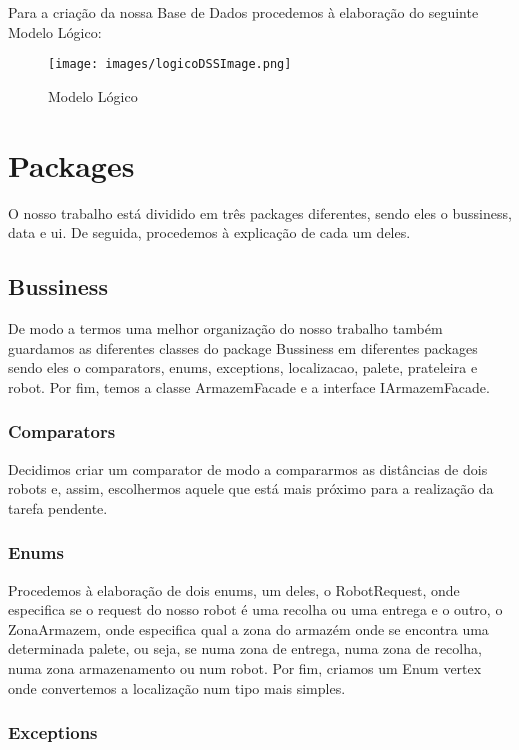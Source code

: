 \documentclass[11pt]{article}
\begin{document}
Para a criação da nossa Base de Dados procedemos à elaboração do seguinte Modelo Lógico:

\begin{figure}[htb]
    \centering
    \texttt{[image: images/logicoDSSImage.png]}
    \caption{Modelo Lógico}
    \label{fig:my_label3}
\end{figure}

\section{Packages}

O nosso trabalho está dividido em três packages diferentes, sendo eles o bussiness, data e ui. De seguida, procedemos à explicação de cada um deles.

\subsection{Bussiness}

De modo a termos uma melhor organização do nosso trabalho também guardamos as diferentes classes do package Bussiness em diferentes packages sendo eles o comparators, enums, exceptions, localizacao, palete, prateleira e robot. Por fim, temos a classe ArmazemFacade e a interface IArmazemFacade.

\subsubsection{Comparators}

Decidimos criar um comparator de modo a compararmos as distâncias de dois robots e, assim, escolhermos aquele que está mais próximo para a realização da tarefa pendente.

\subsubsection{Enums}

Procedemos à elaboração de dois enums, um deles, o RobotRequest, onde especifica se o request do nosso robot é uma recolha ou uma entrega e o outro, o ZonaArmazem, onde especifica qual a zona do armazém onde se encontra uma determinada palete, ou seja, se numa zona de entrega, numa zona de recolha, numa zona armazenamento ou num robot. Por fim, criamos um Enum vertex onde convertemos a localização num tipo mais simples. 

\subsubsection{Exceptions}
\end{document}
